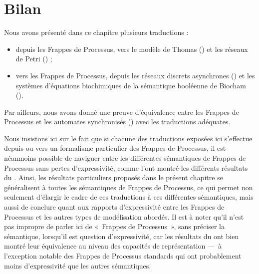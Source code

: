 











% 


\section{Bilan}
Nous avons présenté dans ce chapitre plusieurs traductions :
\begin{itemize}
  \item depuis les Frappes de Processus,
    vers le modèle de Thomas ()
    et les réseaux de Petri () ;
  \item vers les Frappes de Processus,
    depuis les réseaux discrets asynchrones ()
    et les systèmes d'équations biochimiques de la sémantique booléenne de Biocham
    ().
\end{itemize}
Par ailleurs, nous avons donné une preuve d'équivalence entre les Frappes de Processus
et les automates synchronisés () avec les traductions adéquates.

Nous insistons ici sur le fait que si chacune des traductions exposées ici
s'effectue depuis ou vers un formalisme particulier des Frappes de Processus,
il est néanmoins possible de naviguer entre les différentes sémantiques de Frappes
de Processus sans pertes d'expressivité, comme l'ont montré
les différents résultats du .
Ainsi, les résultats particuliers proposés dans le présent chapitre
se généralisent à toutes les sémantiques de Frappes de Processus,
ce qui permet non seulement d'élargir le cadre de ces traductions
à ces différentes sémantiques,
mais aussi de conclure quant aux rapports d'expressivité entre les Frappes de Processus
et les autres types de modélisation abordés.
Il est à noter qu'il n'est pas impropre de parler ici de «~Frappes de Processus~»,
sans préciser la sémantique, lorsqu'il est question d'expressivité,
car les résultats du  ont bien montré leur équivalence au niveau
des capacités de représentation ---~à l'exception notable des Frappes de Processus standards
qui ont probablement moins d'expressivité que les autres sémantiques.
